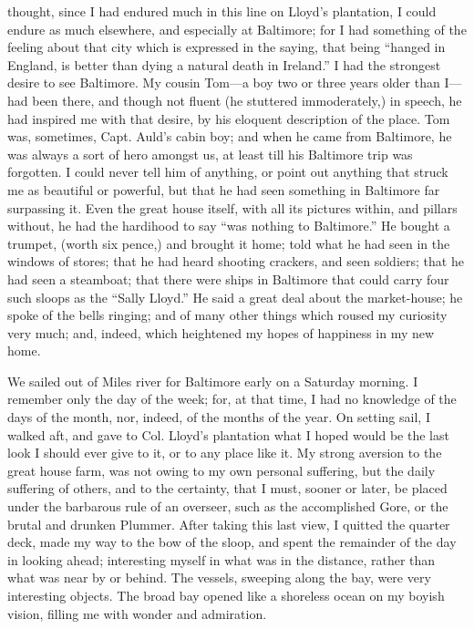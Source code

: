 thought, since I had endured much in this line on Lloyd's plantation, I
could endure as much elsewhere, and especially at Baltimore; for I had
something of the feeling about that city which is expressed in the
saying, that being ``hanged in England, is better than dying a natural
death in Ireland.'' I had the strongest desire to see Baltimore. My
cousin Tom---a boy two or three years older than I---had been there, and
though not fluent (he stuttered immoderately,) in speech, he had
inspired me with that desire, by his
{\protect\hypertarget{136}{}{}}eloquent description of the place. Tom
was, sometimes, Capt. Auld's cabin boy; and when he came from Baltimore,
he was always a sort of hero amongst us, at least till his Baltimore
trip was forgotten. I could never tell him of anything, or point out
anything that struck me as beautiful or powerful, but that he had seen
something in Baltimore far surpassing it. Even the great house itself,
with all its pictures within, and pillars without, he had the hardihood
to say ``was nothing to Baltimore.'' He bought a trumpet, (worth six
pence,) and brought it home; told what he had seen in the windows of
stores; that he had heard shooting crackers, and seen soldiers; that he
had seen a steamboat; that there were ships in Baltimore that could
carry four such sloops as the ``Sally Lloyd.'' He said a great deal
about the market-house; he spoke of the bells ringing; and of many other
things which roused my curiosity very much; and, indeed, which
heightened my hopes of happiness in my new home.

We sailed out of Miles river for Baltimore early on a Saturday morning.
I remember only the day of the week; for, at that time, I had no
knowledge of the days of the month, nor, indeed, of the months of the
year. On setting sail, I walked aft, and gave to Col. Lloyd's plantation
what I hoped would be the last look I should ever give to it, or to any
place like it. My strong aversion to the great house farm, was not owing
to my own personal suffering, but the daily suffering of others, and to
the certainty, that I must, sooner or later, be placed under the
barbarous rule of an overseer, such as the accomplished Gore, or the
{\protect\hypertarget{137}{}{}}brutal and drunken Plummer. After taking
this last view, I quitted the quarter deck, made my way to the bow of
the sloop, and spent the remainder of the day in looking ahead;
interesting myself in what was in the distance, rather than what was
near by or behind. The vessels, sweeping along the bay, were very
interesting objects. The broad bay opened like a shoreless ocean on my
boyish vision, filling me with wonder and admiration.

